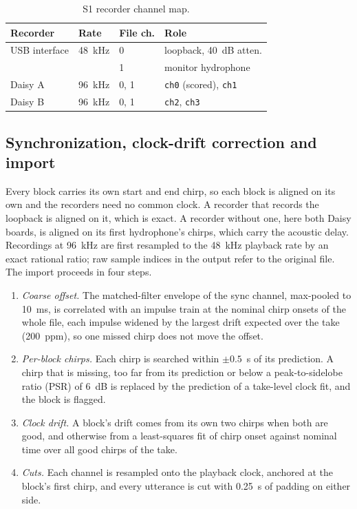 \documentclass[conference]{IEEEtran}
\begin{document}
\begin{table}[t]
\caption{S1 recorder channel map.}
\label{tab:chmap}
\centering
\small
\begin{tabular}{llll}
\hline
Recorder & Rate & File ch. & Role \\
\hline
USB interface & 48~kHz & 0 & loopback, 40~dB atten. \\
              &        & 1 & monitor hydrophone \\
Daisy A & 96~kHz & 0, 1 & \texttt{ch0} (scored), \texttt{ch1} \\
Daisy B & 96~kHz & 0, 1 & \texttt{ch2}, \texttt{ch3} \\
\hline
\end{tabular}
\end{table}

\subsection{Synchronization, clock-drift correction and import}
\label{sec:sync}
Every block carries its own start and end chirp, so each block is aligned on its own and the recorders
need no common clock. A recorder that records the loopback is aligned on it, which is exact. A recorder
without one, here both Daisy boards, is aligned on its first hydrophone's chirps, which carry the
acoustic delay. Recordings at 96~kHz are first resampled to the 48~kHz playback rate by an exact
rational ratio; raw sample indices in the output refer to the original file. The import proceeds in
four steps.
\begin{enumerate}
\item \textit{Coarse offset.} The matched-filter envelope of the sync channel, max-pooled to 10~ms, is
correlated with an impulse train at the nominal chirp onsets of the whole file, each impulse widened by
the largest drift expected over the take (200~ppm), so one missed chirp does not move the offset.
\item \textit{Per-block chirps.} Each chirp is searched within $\pm 0.5$~s of its prediction. A chirp
that is missing, too far from its prediction or below a peak-to-sidelobe ratio (PSR) of 6~dB is
replaced by the prediction of a take-level clock fit, and the block is flagged.
\item \textit{Clock drift.} A block's drift comes from its own two chirps when both are good, and
otherwise from a least-squares fit of chirp onset against nominal time over all good chirps of the
take.
\item \textit{Cuts.} Each channel is resampled onto the playback clock, anchored at the block's first
chirp, and every utterance is cut with 0.25~s of padding on either side.
\end{enumerate}
\end{document}
